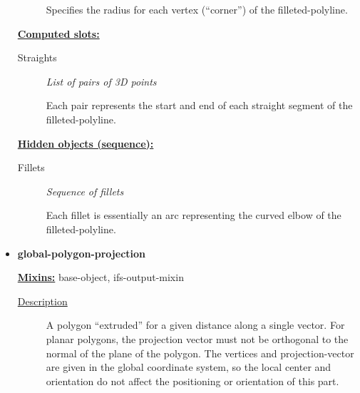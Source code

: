 \documentclass [11pt]{book}
\begin{document}
\begin{itemize}
\begin{description}
 Specifies the radius for each vertex (``corner'') of the filleted-polyline.




\end{description}






\textbf{
\underline{Computed slots:}}

\begin{description}

\item [Straights]
\emph{List of pairs of 3D points}

 Each pair represents the start and end of each straight segment of the
filleted-polyline.




\end{description}






\textbf{
\underline{Hidden objects (sequence):}}

\begin{description}

\item [Fillets]
\emph{Sequence of fillets}

 Each fillet is essentially an arc representing the curved elbow
of the filleted-polyline.




\end{description}







\item {}
\label{prim:global-polygon-projection}
\textbf{global-polygon-projection}


\textbf{
\underline{Mixins:}} base-object, ifs-output-mixin





\begin{description}

\item [
\underline{Description}]


A polygon ``extruded'' for a given distance along a single vector.
For planar polygons, the projection vector must not be orthogonal to the normal of the plane of
the polygon. The vertices and projection-vector are given in the global coordinate system, so
the local center and orientation do not affect the positioning or orientation of this part.




\end{description}
\end{itemize}
\end{document}
